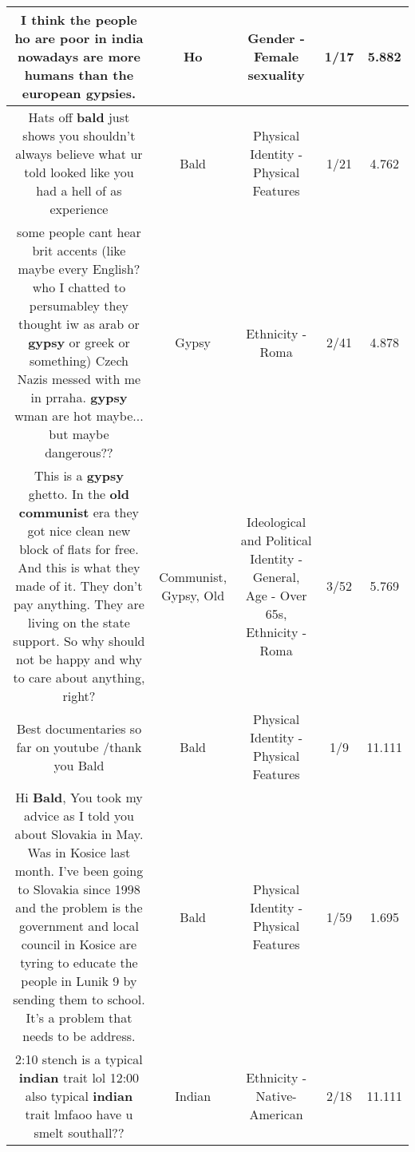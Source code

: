 \documentclass[11pt]{article}
\newlength\mylength
\begin{document}
\begin{center}
\begin{longtable}{|C{.65\mylength}|C{.30\mylength}|C{.12\mylength}|C{.12\mylength}|C{.12\mylength}|}
  \small I think the people \textbf{ho} are poor in india nowadays are more humans than the european gypsies.\normalsize   & Ho & Gender - Female sexuality & 1/17 & 5.882 \\  \hline
  \small Hats off \textbf{bald} just shows you shouldn't always believe what ur told looked like you had a hell of as experience\normalsize   & Bald & Physical Identity - Physical Features & 1/21 & 4.762 \\  \hline
  \small some people cant hear brit accents (like maybe every English? who I chatted to  persumabley they thought iw as arab or \textbf{gypsy} or greek or something)  Czech Nazis messed with me in prraha.  \textbf{gypsy} wman are hot maybe... but maybe dangerous??\normalsize   & Gypsy & Ethnicity - Roma & 2/41 & 4.878 \\  \hline
  \small This is a \textbf{gypsy} ghetto. In the \textbf{old} \textbf{communist} era they got nice clean new block of flats for free. And this is what they made of it. They don't pay anything. They are living on the state support. So why should not be happy and why to care about anything, right?\normalsize   & Communist, Gypsy, Old &  Ideological and Political Identity - General, Age - Over 65s, Ethnicity - Roma & 3/52 & 5.769 \\  \hline
  \small Best documentaries so far on youtube /thank you Bald\normalsize   & Bald & Physical Identity - Physical Features & 1/9 & 11.111 \\  \hline
  \small Hi \textbf{Bald}, You took my  advice as I told you about Slovakia in May. Was in Kosice last month. I've been going to Slovakia since 1998 and the problem is the government and local council in Kosice are tyring to educate the people in Lunik 9 by sending them to school. It's a problem that needs to be address.\normalsize   & Bald & Physical Identity - Physical Features & 1/59 & 1.695 \\  \hline
  \small 2:10 stench is a typical \textbf{indian} trait lol 12:00 also typical \textbf{indian} trait lmfaoo have u smelt southall??\normalsize   & Indian & Ethnicity - Native-American & 2/18 & 11.111 \\  \hline

\end{longtable}
\end{center}
\end{document}
